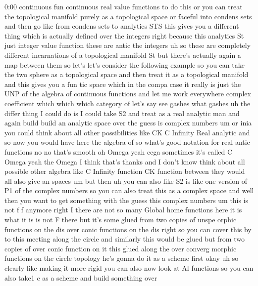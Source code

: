 \begin{unfinished}{0:00}
continuous  fun  continuous  real  value
functions  to  do
this  or  you  can  treat  the  topological
manifold  purely  as  a  topological  space
or  faceful  into  condens  sets  and  then  go
like  from  condens  sets  to  analytics  STS
this  gives  you  a  different  thing  which
is  actually  defined  over  the  integers
right  because  this  analytics  St
just  integer  value  function  these  are
antic  the
integers  uh  so  these  are  completely
different  incarnations  of  a  topological
manifold
St  but  there's  actually  again  a  map
between
them
so  let's  let's  consider  the  following
example
so  you  can  take  the  two  sphere  as  a
topological
space  and  then  treat  it  as  a  topological
manifold  and  this  gives  you  a  fun
tic  space  which  in  the  compa  case  it
really  is  just  the  UNP  of  the  algebra  of
continuous
functions  and  let  me  work
everywhere  complex
coefficient  which  which  which  category
of  let's  say  see  gashes  what
gashes  uh  the  differ  thing  I  could  do  is
I  could
take
S2  and  treat  as  a  real  analytic
man  and  again
build  build  an  analytic  space  over  the
guess  is  complex
numbers  um  or  inia  you  could  think  about
all  other  possibilities  like  CK  C
Infinity  Real  analytic  and  so  now  you
would  have  here  the  algebra  of  so  what's
good  notation  for  real  antic
functions  no  no  that's  smooth  oh  Omega
yeah
cega  sometimes  it's  called  C  Omega
yeah  the  Omega  I  think  that's
thanks  and  I  don't  know  think  about  all
possible  other  algebra  like  C  Infinity
function  CK  function  between  they  would
all  also  give  an
spaces
um
but  then  uh  you  can  also  like  S2  is  like
one  version
of  P1  of  the  complex  numbers  so  you  can
also  treat  this  as  a  complex  space  and
well  then  you  want  to  get  something  with
the  guess  this  complex
numbers  um  this  is  not  f  f  anymore  right
I  there  are  not  so  many  Global  home
functions  here  it  is  what  it
is  is  not
F  there  but  it's  some
glued  from  two
copies  of  unspe
orphic  functions  on  the  dis  over  conic
functions  on  the  dis  right  so  you  can
cover  this  by  to  this  meeting  along  the
circle  and  similarly  this  would  be  glued
but  from  two  copies  of  over  conic
function  on  it  this  glued  along  the  over
converg  morphic  functions  on  the
circle
topology  he's  gonna  do  it  as  a  scheme
first
okay  uh  so
clearly  like  making  it  more  rigid  you
can  also  now  look  at  Al  functions  so  you
can  also  take1
c  as  a  scheme  and  build  something  over

\end{unfinished}
